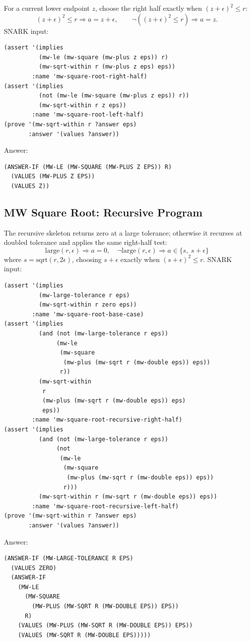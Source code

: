 \documentclass[runningheads]{llncs}
\begin{document}
For a current lower endpoint \(z\), choose the right half exactly when
\((z+\epsilon)^2\leq r\):
\[
  (z+\epsilon)^2\leq r \Rightarrow a=z+\epsilon,
  \qquad
  \neg((z+\epsilon)^2\leq r) \Rightarrow a=z.
\]
SNARK input:
\begin{lstlisting}
(assert '(implies
          (mw-le (mw-square (mw-plus z eps)) r)
          (mw-sqrt-within r (mw-plus z eps) eps))
        :name 'mw-square-root-right-half)
(assert '(implies
          (not (mw-le (mw-square (mw-plus z eps)) r))
          (mw-sqrt-within r z eps))
        :name 'mw-square-root-left-half)
(prove '(mw-sqrt-within r ?answer eps)
       :answer '(values ?answer))
\end{lstlisting}
Answer:
\begin{lstlisting}
(ANSWER-IF (MW-LE (MW-SQUARE (MW-PLUS Z EPS)) R)
  (VALUES (MW-PLUS Z EPS))
  (VALUES Z))
\end{lstlisting}

\subsection{MW Square Root: Recursive Program}

The recursive skeleton returns zero at a large tolerance; otherwise it recurses
at doubled tolerance and applies the same right-half test:
\[
  \mathrm{large}(r,\epsilon) \Rightarrow a=0,
  \quad
  \neg\mathrm{large}(r,\epsilon) \Rightarrow
  a \in \{s,\;s+\epsilon\}
\]
where \(s=\mathrm{sqrt}(r,2\epsilon)\), choosing \(s+\epsilon\) exactly when
\((s+\epsilon)^2\leq r\).  SNARK input:
\begin{lstlisting}
(assert '(implies
          (mw-large-tolerance r eps)
          (mw-sqrt-within r zero eps))
        :name 'mw-square-root-base-case)
(assert '(implies
          (and (not (mw-large-tolerance r eps))
               (mw-le
                (mw-square
                 (mw-plus (mw-sqrt r (mw-double eps)) eps))
                r))
          (mw-sqrt-within
           r
           (mw-plus (mw-sqrt r (mw-double eps)) eps)
           eps))
        :name 'mw-square-root-recursive-right-half)
(assert '(implies
          (and (not (mw-large-tolerance r eps))
               (not
                (mw-le
                 (mw-square
                  (mw-plus (mw-sqrt r (mw-double eps)) eps))
                 r)))
          (mw-sqrt-within r (mw-sqrt r (mw-double eps)) eps))
        :name 'mw-square-root-recursive-left-half)
(prove '(mw-sqrt-within r ?answer eps)
       :answer '(values ?answer))
\end{lstlisting}
Answer:
\begin{lstlisting}
(ANSWER-IF (MW-LARGE-TOLERANCE R EPS)
  (VALUES ZERO)
  (ANSWER-IF
    (MW-LE
      (MW-SQUARE
        (MW-PLUS (MW-SQRT R (MW-DOUBLE EPS)) EPS))
      R)
    (VALUES (MW-PLUS (MW-SQRT R (MW-DOUBLE EPS)) EPS))
    (VALUES (MW-SQRT R (MW-DOUBLE EPS)))))
\end{lstlisting}
\end{document}
